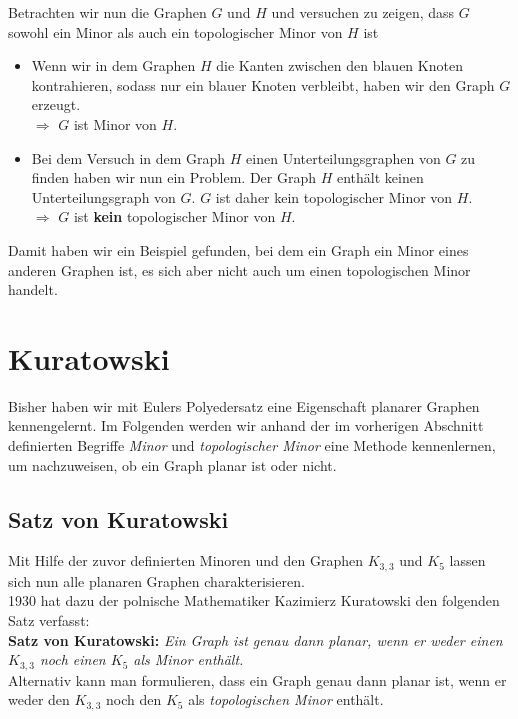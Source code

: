 \documentclass[a4paper]{article}
\begin{document}
Betrachten wir nun die Graphen $G$ und $H$ und versuchen zu zeigen, dass $G$ sowohl ein Minor als auch ein topologischer Minor von $H$ ist
\begin{itemize}
    \item Wenn wir in dem Graphen $H$ die Kanten zwischen den blauen Knoten kontrahieren, sodass nur ein blauer Knoten verbleibt, haben wir den Graph $G$ erzeugt.\\
    $\Rightarrow$ $G$ ist Minor von $H$.
    \item Bei dem Versuch in dem Graph $H$ einen Unterteilungsgraphen von $G$ zu finden haben wir nun ein Problem. Der Graph $H$ enthält keinen Unterteilungsgraph von $G$. $G$ ist daher kein topologischer Minor von $H$.\\
    $\Rightarrow$ $G$ ist \textbf{kein} topologischer Minor von $H$.
\end{itemize}

Damit haben wir ein Beispiel gefunden, bei dem ein Graph ein Minor eines anderen Graphen ist, es sich aber nicht auch um einen topologischen Minor handelt.

\newpage

\section{Kuratowski}
Bisher haben wir mit Eulers Polyedersatz eine Eigenschaft planarer Graphen kennengelernt.
Im Folgenden werden wir anhand der im vorherigen Abschnitt definierten Begriffe \textit{Minor} und \textit{topologischer Minor} eine Methode kennenlernen, um nachzuweisen, ob ein Graph planar ist oder nicht.\\

\subsection{Satz von Kuratowski}
Mit Hilfe der zuvor definierten Minoren und den Graphen $K_{3,3}$ und $K_5$ lassen sich nun alle planaren Graphen charakterisieren.\\

1930 hat dazu der polnische Mathematiker Kazimierz Kuratowski den folgenden Satz verfasst:\\

\textbf{Satz von Kuratowski:}
\textit{Ein Graph ist genau dann planar, wenn er weder einen $K_{3,3}$ noch einen $K_5$ als Minor enthält.}\\


Alternativ kann man formulieren, dass ein Graph genau dann planar ist, wenn er weder den $K_{3,3}$ noch den $K_5$ als \textit{topologischen Minor} enthält.\\
\end{document}
